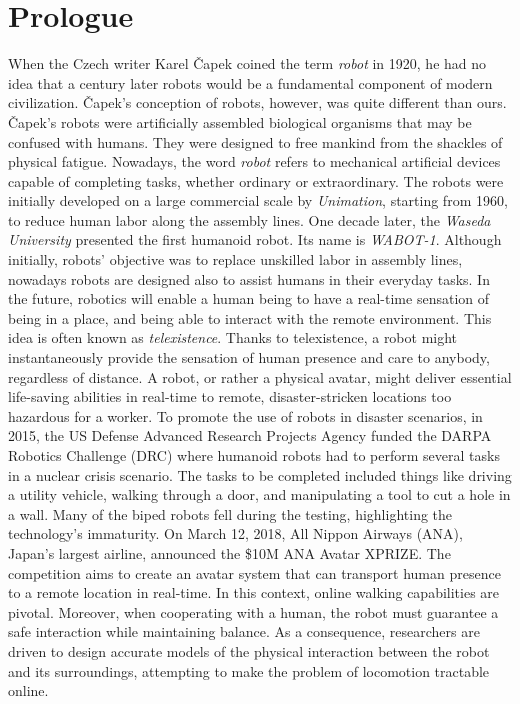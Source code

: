
\chapter*{Prologue}

\lhead{\leftmark}

When the Czech writer Karel Čapek coined the term \emph{robot} in 1920, he had no idea that a century later robots would be a fundamental component of modern civilization. Čapek's conception of robots, however, was quite different than ours. Čapek's robots were artificially assembled biological organisms that may be confused with humans. They were designed to free mankind from the shackles of physical fatigue. 
Nowadays, the word \emph{robot} refers to mechanical artificial devices capable of completing tasks, whether ordinary or extraordinary. The robots were initially developed on a large commercial scale by \emph{Unimation}, starting from 1960, to reduce human labor along the assembly lines. One decade later, the \emph{Waseda University} presented the first humanoid robot. Its name is \emph{WABOT-1}.
Although initially, robots' objective was to replace unskilled labor in assembly lines, nowadays robots are designed also to assist humans in their everyday tasks. In the future, robotics will enable a human being to have a real-time sensation of being in a place, and being able to interact with the remote environment. This idea is often known as \emph{telexistence}. Thanks to telexistence, a robot might instantaneously provide the sensation of human presence and care to anybody, regardless of distance.  A robot, or rather a physical avatar, might deliver essential life-saving abilities in real-time to remote, disaster-stricken locations too hazardous for a worker.
To promote the use of robots in disaster scenarios, in 2015, the US Defense Advanced Research Projects Agency funded the DARPA Robotics Challenge (DRC) where humanoid robots had to perform several tasks in a nuclear crisis scenario.
The tasks to be completed included things like driving a utility vehicle, walking through a door, and manipulating a tool to cut a hole in a wall. Many of the biped robots fell during the testing, highlighting the technology's immaturity.
On March 12, 2018, All Nippon Airways (ANA), Japan’s largest airline, announced the \$10M ANA Avatar XPRIZE. The competition aims to create an avatar system that can transport human presence to a remote location in real-time. In this context, online walking capabilities are pivotal. Moreover, when cooperating with a human, the robot must guarantee a safe interaction while maintaining balance. As a consequence, researchers are driven to design accurate models of the physical interaction between the robot and its surroundings, attempting to make the problem of locomotion tractable online.
